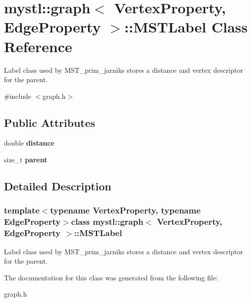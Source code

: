\hypertarget{classmystl_1_1graph_1_1MSTLabel}{\section{mystl\+:\+:graph$<$ Vertex\+Property, Edge\+Property $>$\+:\+:M\+S\+T\+Label Class Reference}
\label{classmystl_1_1graph_1_1MSTLabel}
}


Label class used by M\+S\+T\+\_\+prim\+\_\+jarniks stores a distance and vertex descriptor for the parent.  




{\ttfamily \#include $<$graph.\+h$>$}

\subsection*{Public Attributes}
\begin{DoxyCompactItemize}
\item 
\hypertarget{classmystl_1_1graph_1_1MSTLabel_a20782a95283cc0b02843d0e69a5c49b7}{double {\bfseries distance}}\label{classmystl_1_1graph_1_1MSTLabel_a20782a95283cc0b02843d0e69a5c49b7}

\item 
\hypertarget{classmystl_1_1graph_1_1MSTLabel_ab0a5bc456f2c64eeda2f2de8ac20b536}{size\+\_\+t {\bfseries parent}}\label{classmystl_1_1graph_1_1MSTLabel_ab0a5bc456f2c64eeda2f2de8ac20b536}

\end{DoxyCompactItemize}


\subsection{Detailed Description}
\subsubsection*{template$<$typename Vertex\+Property, typename Edge\+Property$>$class mystl\+::graph$<$ Vertex\+Property, Edge\+Property $>$\+::\+M\+S\+T\+Label}

Label class used by M\+S\+T\+\_\+prim\+\_\+jarniks stores a distance and vertex descriptor for the parent. 

The documentation for this class was generated from the following file\+:\begin{DoxyCompactItemize}
\item 
graph.\+h\end{DoxyCompactItemize}
